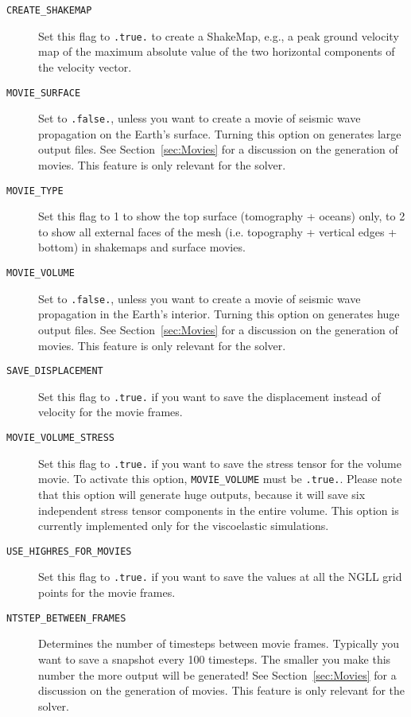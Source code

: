 \vspace{1cm}
\begin{description}
\item [{\texttt{CREATE\_SHAKEMAP}}] Set this flag to \texttt{.true.} to
create a ShakeMap\textregistered{}, e.g., a peak ground velocity map
of the maximum absolute value of the two horizontal components of
the velocity vector.
\item [{\texttt{MOVIE\_SURFACE}}] Set to \texttt{.false.}, unless you want
to create a movie of seismic wave propagation on the Earth's surface.
Turning this option on generates large output files. See Section~\ref{sec:Movies}
for a discussion on the generation of movies. This feature is only
relevant for the solver.
\item [{\texttt{MOVIE\_TYPE}}] Set this flag to 1 to show the top surface
(tomography + oceans) only, to 2 to show all external faces of the
mesh (i.e. topography + vertical edges + bottom) in shakemaps and
surface movies.
\item [{\texttt{MOVIE\_VOLUME}}] Set to \texttt{.false.}, unless you want
to create a movie of seismic wave propagation in the Earth's interior.
Turning this option on generates huge output files. See Section~\ref{sec:Movies}
for a discussion on the generation of movies. This feature is only
relevant for the solver.
\item [{\texttt{SAVE\_DISPLACEMENT}}] Set this flag to \texttt{.true.}
if you want to save the displacement instead of velocity for the movie
frames.
\item [{\texttt{MOVIE\_VOLUME\_STRESS}}] Set this flag to \texttt{.true.}
if you want to save the stress tensor for the volume movie.
To activate this option, \texttt{MOVIE\_VOLUME} must be \texttt{.true.}.
Please note that this option will generate huge outputs, because it will save six independent stress tensor components in the entire volume.
This option is currently implemented only for the viscoelastic simulations.
\item [{\texttt{USE\_HIGHRES\_FOR\_MOVIES}}] Set this flag to \texttt{.true.}
if you want to save the values at all the NGLL grid points for the
movie frames.
\item [{\texttt{NTSTEP\_BETWEEN\_FRAMES}}] Determines the number of timesteps
between movie frames. Typically you want to save a snapshot every
100 timesteps. The smaller you make this number the more output will
be generated! See Section~\ref{sec:Movies} for a discussion on the
generation of movies. This feature is only relevant for the solver.

\end{description}
